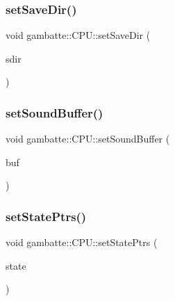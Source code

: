 \mbox{\label{classgambatte_1_1CPU_a9c882b42b4e426ae9368a181108f6e92}} 
\subsubsection{\texorpdfstring{set\+Save\+Dir()}{setSaveDir()}}
{\footnotesize\ttfamily void gambatte\+::\+C\+P\+U\+::set\+Save\+Dir (\begin{DoxyParamCaption}\item[{std\+::string const \&}]{sdir }\end{DoxyParamCaption})\hspace{0.3cm}{\ttfamily [inline]}}

\mbox{\label{classgambatte_1_1CPU_ae278996f1f2e328a0340737f856d29c2}} 
\subsubsection{\texorpdfstring{set\+Sound\+Buffer()}{setSoundBuffer()}}
{\footnotesize\ttfamily void gambatte\+::\+C\+P\+U\+::set\+Sound\+Buffer (\begin{DoxyParamCaption}\item[{\hyperlink{namespacegambatte_a0639f09fccfbbd5a8e0796318768e370}{uint\+\_\+least32\+\_\+t} $\ast$}]{buf }\end{DoxyParamCaption})\hspace{0.3cm}{\ttfamily [inline]}}

\mbox{\label{classgambatte_1_1CPU_ad3536333dfdf2152288d68cd6a0f85f6}} 
\subsubsection{\texorpdfstring{set\+State\+Ptrs()}{setStatePtrs()}}
{\footnotesize\ttfamily void gambatte\+::\+C\+P\+U\+::set\+State\+Ptrs (\begin{DoxyParamCaption}\item[{\hyperlink{structgambatte_1_1SaveState}{Save\+State} \&}]{state }\end{DoxyParamCaption})}

